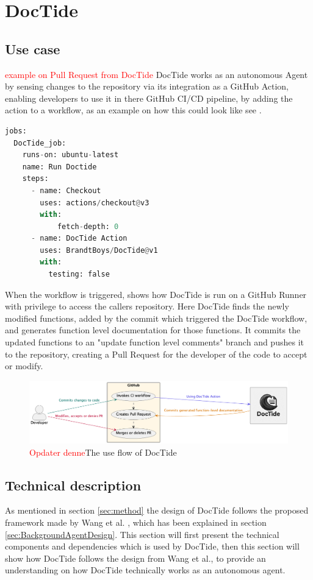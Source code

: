 \section{DocTide}
\label{sec:DesignDocTide}
\subsection{Use case}
\textcolor{red}{example on Pull Request from DocTide }
DocTide works as an autonomous Agent by sensing changes to the repository via its integration as a GitHub Action, enabling developers to use it in there GitHub CI/CD pipeline, by adding the action to a workflow, as an example on how this could look like see .
\begin{lstlisting}[language=Python, label={lst:flow}, caption=Example on how to use DocTide in a workflow]
jobs:
  DocTide_job:
    runs-on: ubuntu-latest
    name: Run Doctide
    steps:
      - name: Checkout
        uses: actions/checkout@v3
        with:
            fetch-depth: 0
      - name: DocTide Action
        uses: BrandtBoys/DocTide@v1
        with:
          testing: false
\end{lstlisting}
When the workflow is triggered,  shows how DocTide is run on a GitHub Runner with privilege to access the callers repository. Here DocTide finds the newly modified functions, added by the commit which triggered the DocTide workflow, and generates function level documentation for those functions. It commits the updated functions to an "update function level comments" branch and pushes it to the repository, creating a Pull Request for the developer of the code to accept or modify.
\begin{figure}[H]
\centering
\includegraphics[width=0.7\linewidth]{Figures/doctide_flow.png}
\caption{\textcolor{red}{Opdater denne}The use flow of DocTide}
\label{fig:flow_doctide}
\end{figure}
\subsection{Technical description}
As mentioned in section \ref{sec:method} the design of DocTide follows the proposed framework made by Wang et al. \cite{wang2024survey}, which has been explained in section \ref{sec:BackgroundAgentDesign}. This section will first present the technical components and dependencies which is used by DocTide, then this section will show how DocTide follows the design from Wang et al., to provide an understanding on how DocTide technically works as an autonomous agent.

